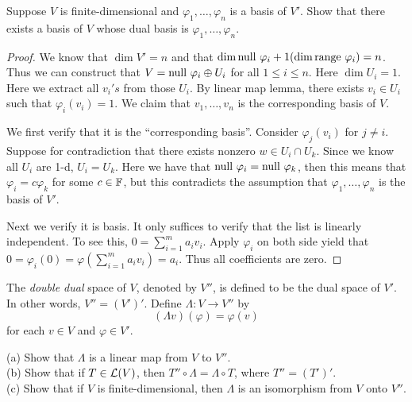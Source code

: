 \documentclass{extarticle}
\begin{document}
\begin{problem}{30}
    Suppose \(V\) is finite-dimensional and \(\varphi_1, \ldots, \varphi_n\) is a basis of \(V'\). 
    Show that there exists a basis of \(V\) whose dual basis is \(\varphi_1, \ldots, \varphi_n\).
\end{problem}

\begin{proof}
We know that \(\dim V' = n\) and that \(\dim \text{null } \varphi_i + 1 (\dim \text{range } \varphi_i) = n\). Thus 
we can construct that \(V = \text{null } \varphi_i \oplus U_i\) for all \(1 \leq i \leq n\). Here 
\(\dim U_i = 1\). Here we extract all \(v_i's\) from those \(U_i\). By linear map lemma, there exists 
\(v_i \in U_i\) such that \(\varphi_i (v_i)= 1\). We claim that \(v_1, \ldots, v_n\) is the 
corresponding basis of \(V\). 

We first verify that it is the ``corresponding basis''. Consider \(\varphi_j(v_i)\) for \(j \neq i\). 
Suppose for contradiction that there exists nonzero \(w \in U_i \cap U_k\). Since we know all 
\(U_i\) are 1-d, \(U_i = U_k\). Here we have that \(\text{null } \varphi_i = \text{null } \varphi_k\), then this 
means that \(\varphi_i = c \varphi_k\) for some \(c \in \mathbb{F}\), but this contradicts the assumption 
that \(\varphi_1, \ldots, \varphi_n\) is the basis of \(V'\). 

Next we verify it is basis. It only suffices to verify that the list is linearly independent. To 
see this, \(0 = \sum_{i=1}^{m} a_i v_i\). Apply \(\varphi_i\) on both side yield that 
\(0 = \varphi_i(0) = \varphi(\sum_{i=1}^{m} a_i v_i) = a_i\). Thus all coefficients are zero.
\end{proof}


\begin{problem}{32}
    The \emph{double dual} space of \(V\), denoted by \(V''\), is defined to be the dual space of 
    \(V'\). In other words, \(V'' = (V')'\). Define \(\Lambda \colon V \to V''\) by 
    \[(\Lambda v)(\varphi) = \varphi(v)\]
    for each \(v \in V\) and \(\varphi \in V'\).

    (a) Show that \(\Lambda\) is a linear map from \(V\) to \(V''\). \\ 
    (b) Show that if \(T \in \mathcal{L}(V)\), then \(T'' \circ \Lambda = \Lambda \circ T\), where 
    \(T'' = (T')'\). \\ 
    (c) Show that if \(V\) is finite-dimensional, then \(\Lambda\) is an isomorphism from \(V\)
    onto \(V''\). 
\end{problem}
\end{document}
